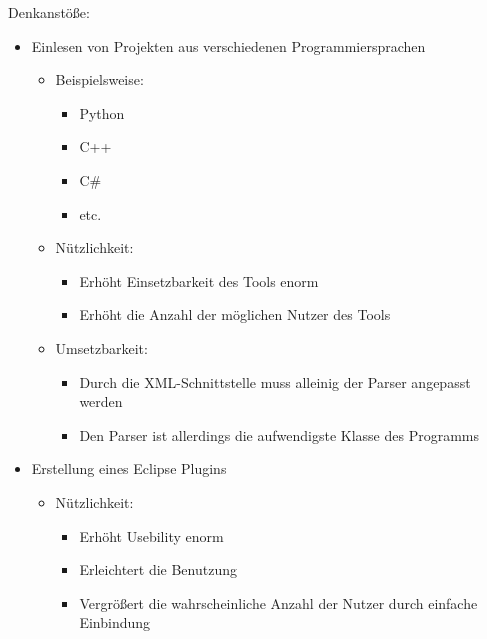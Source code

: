 Denkanstöße:
\begin{itemize}
	\item Einlesen von Projekten aus verschiedenen Programmiersprachen
	\begin{itemize}
		\item Beispielsweise:
		\begin{itemize}
			\item Python
			\item C++
			\item C\#
			\item etc.
		\end{itemize}
			\item Nützlichkeit:
		\begin{itemize}
			\item Erhöht Einsetzbarkeit des Tools enorm
			\item Erhöht die Anzahl der möglichen Nutzer des Tools
		\end{itemize}
			\item Umsetzbarkeit:
		\begin{itemize}
			\item Durch die XML-Schnittstelle muss alleinig der Parser angepasst werden
			\item Den Parser ist allerdings die aufwendigste Klasse des Programms
		\end{itemize}
	\end{itemize}
	\item Erstellung eines Eclipse Plugins
	\begin{itemize}
		\item Nützlichkeit:
		\begin{itemize}
			\item Erhöht Usebility enorm
			\item Erleichtert die Benutzung
			\item Vergrößert die wahrscheinliche Anzahl der Nutzer durch einfache Einbindung
		\end{itemize}

\end{itemize}
\end{itemize}
